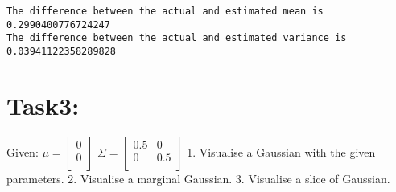 \documentclass[11pt]{article}
\begin{document}
    \begin{Verbatim}[commandchars=\\\{\}]
The difference between the actual and estimated mean is 0.2990400776724247
The difference between the actual and estimated variance is 0.03941122358289828

    \end{Verbatim}

    \section{Task3:}\label{task3}

Given: \(\mu = \begin{bmatrix}  0\\[0.3em]  0\\[0.3em]  \end{bmatrix}\)
\(\Sigma = \begin{bmatrix}  0.5 & 0\\[0.3em]  0 & 0.5\\[0.3em]  \end{bmatrix}\)
1. Visualise a Gaussian with the given parameters. 2. Visualise a
marginal Gaussian. 3. Visualise a slice of Gaussian.
\end{document}
